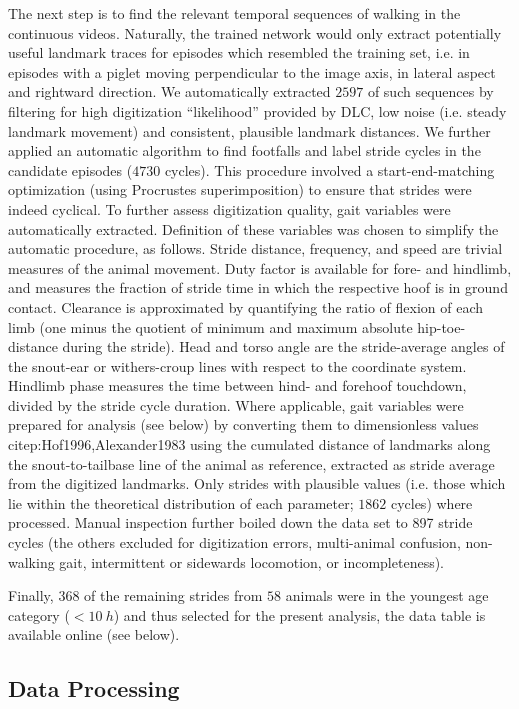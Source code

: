 The next step is to find the relevant temporal sequences of walking in the continuous videos.
Naturally, the trained network would only extract potentially useful landmark traces for episodes which resembled the training set, i.e. in episodes with a piglet moving perpendicular to the image axis, in lateral aspect and rightward direction.
We automatically extracted \(2597\) of such sequences by filtering for high digitization ``likelihood'' provided by DLC, low noise (i.e. steady landmark movement) and consistent, plausible landmark distances.
We further applied an automatic algorithm to find footfalls and label stride cycles in the candidate episodes (\(4730\) cycles).
This procedure involved a start-end-matching optimization (using Procrustes superimposition) to ensure that strides were indeed cyclical.
To further assess digitization quality, gait variables were automatically extracted.
Definition of these variables was chosen to simplify the automatic procedure, as follows.
Stride distance, frequency, and speed are trivial measures of the animal movement.
Duty factor is available for fore- and hindlimb, and measures the fraction of stride time in which the respective hoof is in ground contact.
Clearance is approximated by quantifying the ratio of flexion of each limb (one minus the quotient of minimum and maximum absolute hip-toe-distance during the stride).
Head and torso angle are the stride-average angles of the snout-ear or withers-croup lines with respect to the coordinate system.
Hindlimb phase measures the time between hind- and forehoof touchdown, divided by the stride cycle duration.
Where applicable, gait variables were prepared for analysis (see below) by converting them to dimensionless values citep:Hof1996,Alexander1983 using the cumulated distance of landmarks along the snout-to-tailbase line of the animal as reference, extracted as stride average from the digitized landmarks.
Only strides with plausible values (i.e. those which lie within the theoretical distribution of each parameter; \(1862\) cycles) where processed.
Manual inspection further boiled down the data set to 897 stride cycles (the others excluded for digitization errors, multi-animal confusion, non-walking gait, intermittent or sidewards locomotion, or incompleteness).

Finally, \(368\) of the remaining strides from \(58\) animals were in the youngest age category (\(<10\ h\)) and thus selected for the present analysis, the data table is available online (see below).


\subsection{Data Processing}
\label{sec:orgcb0a26c}

